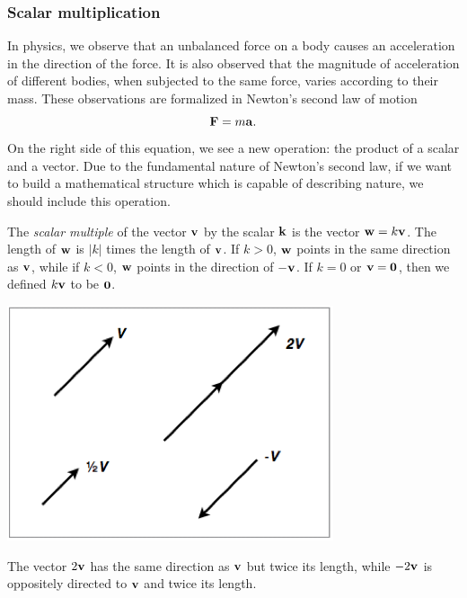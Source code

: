 \documentclass[12pt,letterpaper,reqno]{article}
\numberwithin{equation}{section}
\newcommand{\ti}[1]{\textit{#1}}
\begin{document}
\subsubsection{Scalar multiplication}
In physics, we observe that an unbalanced force on a body causes an acceleration in the direction of the force. It is also observed that the magnitude of acceleration of different bodies, when subjected to the same force, varies according to their mass. These observations are formalized in Newton's second law of motion
\begin{equation}
	{\bf F}=m{\bf a}.
\end{equation}
On the right side of this equation, we see a new operation: the product of a scalar and a vector. Due to the fundamental nature of Newton's second law, if we want to build a mathematical structure which is capable of describing nature, we should include this operation.

\begin{defn}
The \ti{scalar multiple} of the vector ${\bf v}$ by the scalar ${\bf k}$ is the vector ${\bf w}=k{\bf v}$. The length of ${\bf w}$ is $|k|$ times the length of ${\bf v}$. If $k>0$, ${\bf w}$ points in the same direction as ${\bf v}$, while if $k<0$, ${\bf w}$ points in the direction of $-{\bf v}$. If $k=0$ or ${\bf v}={\bf 0}$, then we defined $k{\bf v}$ to be ${\bf 0}$.
\end{defn}

\begin{center}
	\includegraphics[scale=0.5]{figures_mvc/scalar_mult_examples}
\end{center}

\begin{example}
The vector $2{\bf v}$ has the same direction as ${\bf v}$ but twice its length, while $-2{\bf v}$ is oppositely directed to ${\bf v}$ and twice its length.	
\end{example}
\end{document}
